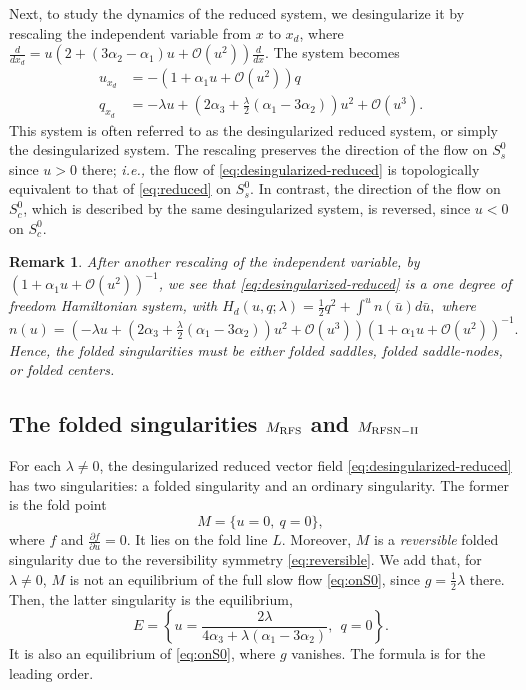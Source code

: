 \documentclass[11pt]{article}
\numberwithin{equation}{section}
\newtheorem{remark}{Remark}[section]
\begin{document}
Next, to study the dynamics of the reduced system, we desingularize it by rescaling the independent variable from $x$ to $x_d$, where
$\frac{d}{dx_d} = u(2 + (3\alpha_2-\alpha_1)u + \mathcal{O}(u^2))\frac{d}{dx}$. 
The system becomes 
\begin{equation}\label{eq:desingularized-reduced}
\begin{split}
    u_{x_d} &= -(1+\alpha_1 u +\mathcal{O}(u^2))  q \\
    q_{x_d} &= -\lambda u + \left( 2\alpha_3 + \frac{\lambda}{2} ( \alpha_1 - 3\alpha_2) \right) u^2 + \mathcal{O}(u^3).
\end{split}
\end{equation}
%
This system is often referred to as the desingularized reduced system,
or simply the desingularized system.
The rescaling preserves the direction of the flow on $S^0_s$ since
$u>0$ there; {\it i.e.,} the flow of \eqref{eq:desingularized-reduced} is topologically equivalent to that of \eqref{eq:reduced} on $S^0_s$.
In contrast, the direction of the flow on $S^0_c$, which is described by the same desingularized system, is reversed, since $u<0$ on $S^0_c$.


\begin{remark}\label{rem:Hamiltonian-desingularizedsystem}
After another rescaling of the independent variable, by $(1+\alpha_1 u + \mathcal{O}(u^2))^{-1}$,
we see that \eqref{eq:desingularized-reduced} is a one degree of freedom Hamiltonian system, with $H_d(u,q;\lambda)=\tfrac{1}{2}q^2 + \int^u n(\bar{u}) d\bar{u},$
where $n(u)= \left( -\lambda u + (2\alpha_3 + \tfrac{\lambda}{2}(\alpha_1 - 3\alpha_2))u^2 + \mathcal{O}(u^3)\right) \left(1 + \alpha_1 u + \mathcal{O}(u^2)\right)^{-1}.$
Hence, the folded singularities must be either folded saddles, folded saddle-nodes, or folded centers.
\end{remark}

\subsection{The folded singularities \texorpdfstring{$M_{\rm RFS}$ and $M_{\rm RFSN-II}$}{Lg}}
\label{sec:MRFS+MRFSNII}

For each $\lambda\ne 0$, the desingularized reduced vector field \eqref{eq:desingularized-reduced} has two singularities: a folded singularity and an ordinary singularity.
The former is the fold point
\begin{equation*}
M = \{ u=0, \ q=0 \},
\end{equation*}
where $f$ and $\frac{\partial f}{\partial u}=0$.
It lies on the fold line $L$.
Moreover, $M$ is a {\it reversible} folded singularity
due to the reversibility symmetry \eqref{eq:reversible}.
We add that, for $\lambda\ne 0$, $M$ is not an equilibrium of the full slow flow \eqref{eq:onS0}, since $g = \frac{1}{2} \lambda$ there.
Then, the latter singularity is the equilibrium,
\begin{equation}
  E = \left\{ u = \frac{2\lambda}{4\alpha_3 + \lambda (\alpha_1 - 3 \alpha_2)}, \ \ q = 0 \right\}.
\end{equation}
It is also an equilibrium of \eqref{eq:onS0}, where $g$ vanishes.
The formula is for the leading order.
\end{document}
